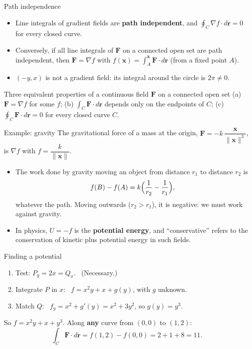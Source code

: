 \documentclass[10pt]{wosm-slides}
\newcommand{\norm}[1]{\lVert #1 \rVert}
\newcommand{\vx}{\mathbf{x}}
\newcommand{\vr}{\mathbf{r}}
\newcommand{\vF}{\mathbf{F}}
\begin{document}
\begin{frame}{Path independence}
  \begin{itemize}
    \item Line integrals of gradient fields are \textbf{path independent}, and $\oint_C \nabla f \cdot d\vr = 0$
      for every closed curve.
    \item Conversely, if all line integrals of $\vF$ on a connected open set are path independent, then
      $\vF = \nabla f$ with $f(\vx) = \int_{A}^{\vx} \vF \cdot d\vr$ (from a fixed point $A$).
    \pause
    \item $(-y, x)$ is not a gradient field: its integral around the circle is $2\pi \ne 0$.
  \end{itemize}
  \pause
  \begin{block}{Three equivalent properties of a continuous field $\vF$ on a connected open set}
    (a) $\vF = \nabla f$ for some $f$; \quad (b) $\int_C \vF \cdot d\vr$ depends only on the endpoints of
    $C$; \quad (c) $\oint_C \vF \cdot d\vr = 0$ for every closed curve $C$.
  \end{block}
\end{frame}

\begin{frame}{Example: gravity}
  The gravitational force of a mass at the origin, $\vF = -k\, \dfrac{\vx}{\norm{\vx}^3}$, is $\nabla f$ with
  $f = \dfrac{k}{\norm{\vx}}$.
  \pause
  \begin{itemize}
    \item The work done by gravity moving an object from distance $r_1$ to distance $r_2$ is
      \[ f(B) - f(A) = k\Bigl(\frac{1}{r_2} - \frac{1}{r_1}\Bigr) , \]
      whatever the path. Moving outwards ($r_2 > r_1$), it is negative: we must work against gravity.
    \pause
    \item In physics, $U = -f$ is the \textbf{potential energy}, and ``conservative'' refers to the
      conservation of kinetic plus potential energy in such fields.
  \end{itemize}
\end{frame}

\begin{frame}{Finding a potential}
  \begin{example}[$\vF = (2xy + 1, \ x^2 + 3y^2)$]
    \begin{enumerate}
      \item Test: $P_y = 2x = Q_x$. \ (Necessary.)
      \pause
      \item Integrate $P$ in $x$: \ $f = x^2 y + x + g(y)$, with $g$ unknown.
      \pause
      \item Match $Q$: \ $f_y = x^2 + g'(y) = x^2 + 3y^2$, so $g(y) = y^3$.
    \end{enumerate}
    \pause
    So $f = x^2 y + x + y^3$. Along \textbf{any} curve from $(0, 0)$ to $(1, 2)$:
    \[ \int_C \vF \cdot d\vr = f(1, 2) - f(0, 0) = 2 + 1 + 8 = 11 . \]
  \end{example}
\end{frame}
\end{document}
